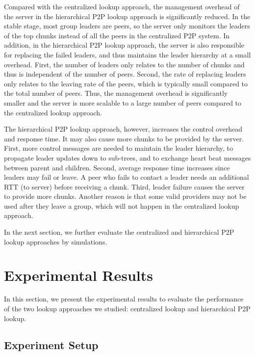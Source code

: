    Compared with the centralized lookup approach, %
    the management overhead of the 
    server in the hierarchical P2P lookup approach %
    is significantly reduced. 
    In the stable stage, most group leaders are peers, so the server
    only monitors the leaders of the top chunks instead of all the peers in 
    the centralized P2P system. 
    In addition, in the hierarchical P2P lookup approach, %
    the server is also responsible
    for replacing the failed leaders, and thus maintains the leader hierarchy
    at a small overhead.
    First, the number of leaders only relates to
    the number of chunks and thus is independent of the number of peers. 
    Second, the rate of replacing leaders 
    only relates to the leaving rate of the peers, which is typically
    small compared to the total number of peers.
    Thus, the management overhead is significantly smaller and the
    server is more scalable to a large number of peers compared
    to the centralized lookup approach. %
    
    The hierarchical P2P lookup approach, %
    however, increases the control overhead and response time. 
    It may also cause more chunks to be provided by the server.
    First, more control messages are needed to maintain the leader
    hierarchy, to propagate leader updates down to sub-trees, and
    to exchange heart beat messages between parent and children. 
    Second, average response time increases since leaders may fail or leave.
    A peer who fails to contact a leader needs an additional RTT (to server) before receiving a chunk. 
    Third, leader failure causes the server to provide more chunks.
    Another reason is that some valid providers
    may not be used after they leave a group, 
    which will not happen in the centralized lookup
    approach. 

    In the next section, we further evaluate the centralized 
    and hierarchical P2P lookup approaches %
    by simulations.

\section{Experimental Results}
\label{s:experiment}
    In this section, we present the experimental results to evaluate 
    the performance of the two lookup approaches we studied: 
    centralized lookup and hierarchical P2P lookup.

\subsection{Experiment Setup}

